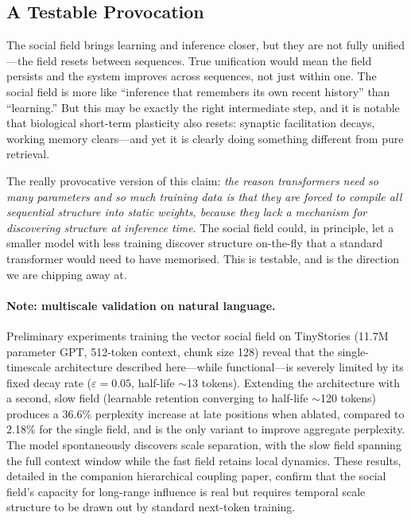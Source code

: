 \documentclass[11pt,a4paper]{article}
\newcommand{\evap}{\varepsilon}
\begin{document}
\subsection{A Testable Provocation}

The social field brings learning and inference closer, but they are not
fully unified---the field resets between sequences.  True unification
would mean the field persists and the system improves across sequences,
not just within one.  The social field is more like ``inference that
remembers its own recent history'' than ``learning.''  But this may be
exactly the right intermediate step, and it is notable that biological
short-term plasticity also resets: synaptic facilitation decays, working
memory clears---and yet it is clearly doing something different from pure
retrieval.

The really provocative version of this claim: \emph{the reason
transformers need so many parameters and so much training data is that
they are forced to compile all sequential structure into static weights,
because they lack a mechanism for discovering structure at inference
time}.  The social field could, in principle, let a smaller model with
less training discover structure on-the-fly that a standard transformer
would need to have memorised.  This is testable, and is the direction we
are chipping away at.

\paragraph{Note: multiscale validation on natural language.}
Preliminary experiments training the vector social field on TinyStories
(11.7M parameter GPT, 512-token context, chunk size 128) reveal that the
single-timescale architecture described here---while functional---is
severely limited by its fixed decay rate ($\evap = 0.05$, half-life
$\sim$13 tokens).  Extending the architecture with a second, slow field
(learnable retention converging to half-life $\sim$120 tokens) produces a
36.6\% perplexity increase at late positions when ablated, compared to
2.18\% for the single field, and is the only variant to improve aggregate
perplexity.  The model spontaneously discovers scale separation, with the
slow field spanning the full context window while the fast field retains
local dynamics.  These results, detailed in the companion hierarchical
coupling paper, confirm that the social field's capacity for long-range
influence is real but requires temporal scale structure to be drawn out
by standard next-token training.
\end{document}
